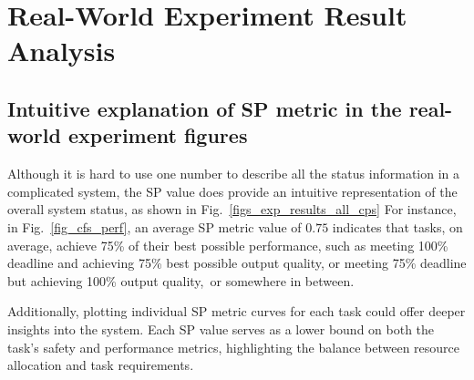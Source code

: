 	\section{Real-World Experiment Result Analysis}
	
	\subsection{Intuitive explanation of SP metric in the real-world experiment figures}
    Although it is hard to use one number to describe all the status information in a complicated system, the SP value does provide an intuitive representation of the overall system status, as shown in Fig.~\ref{figs_exp_results_all_cps}
    For instance, in Fig.~\ref{fig_cfs_perf}, an average SP metric value of $0.75$ indicates that tasks, on average, achieve 75\% of their best possible performance, such as meeting 100\% deadline and achieving 75\% best possible output quality, or meeting 75\% deadline but achieving 100\% output quality, or somewhere in between. 

    Additionally, plotting individual SP metric curves for each task could offer deeper insights into the system. Each SP value serves as a lower bound on both the task’s safety and performance metrics, highlighting the balance between resource allocation and task requirements.

    
